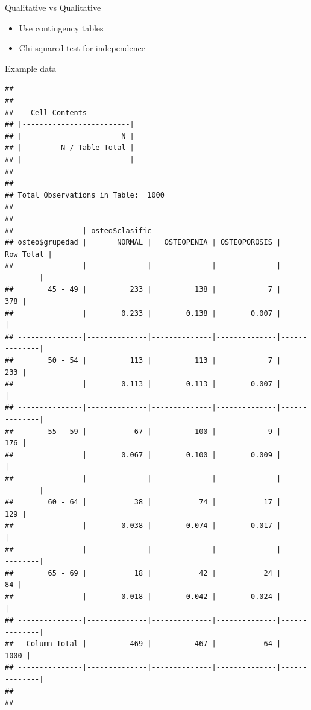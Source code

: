 \documentclass[
  ignorenonframetext,
]{beamer}
\newenvironment{Shaded}{\begin{snugshade}}{\end{snugshade}}
\newcommand{\AttributeTok}[1]{\textcolor[rgb]{0.13,0.29,0.53}{#1}}
\newcommand{\ConstantTok}[1]{\textcolor[rgb]{0.56,0.35,0.01}{#1}}
\newcommand{\FunctionTok}[1]{\textcolor[rgb]{0.13,0.29,0.53}{\textbf{#1}}}
\newcommand{\NormalTok}[1]{#1}
\newcommand{\SpecialCharTok}[1]{\textcolor[rgb]{0.81,0.36,0.00}{\textbf{#1}}}
\providecommand{\tightlist}{%
  \setlength{\itemsep}{0pt}\setlength{\parskip}{0pt}}
\begin{document}
\begin{frame}[fragile]{Qualitative vs Qualitative}
\label{qualitative-vs-qualitative}
\begin{itemize}
\tightlist
\item
  Use contingency tables
\item
  Chi-squared test for independence
\end{itemize}

\begin{block}{Example data}
\label{example-data}
\begin{Shaded}
\end{Shaded}

\begin{verbatim}
## 
##  
##    Cell Contents
## |-------------------------|
## |                       N |
## |         N / Table Total |
## |-------------------------|
## 
##  
## Total Observations in Table:  1000 
## 
##  
##                | osteo$clasific 
## osteo$grupedad |       NORMAL |   OSTEOPENIA | OSTEOPOROSIS |    Row Total | 
## ---------------|--------------|--------------|--------------|--------------|
##        45 - 49 |          233 |          138 |            7 |          378 | 
##                |        0.233 |        0.138 |        0.007 |              | 
## ---------------|--------------|--------------|--------------|--------------|
##        50 - 54 |          113 |          113 |            7 |          233 | 
##                |        0.113 |        0.113 |        0.007 |              | 
## ---------------|--------------|--------------|--------------|--------------|
##        55 - 59 |           67 |          100 |            9 |          176 | 
##                |        0.067 |        0.100 |        0.009 |              | 
## ---------------|--------------|--------------|--------------|--------------|
##        60 - 64 |           38 |           74 |           17 |          129 | 
##                |        0.038 |        0.074 |        0.017 |              | 
## ---------------|--------------|--------------|--------------|--------------|
##        65 - 69 |           18 |           42 |           24 |           84 | 
##                |        0.018 |        0.042 |        0.024 |              | 
## ---------------|--------------|--------------|--------------|--------------|
##   Column Total |          469 |          467 |           64 |         1000 | 
## ---------------|--------------|--------------|--------------|--------------|
## 
## 
\end{verbatim}
\end{block}
\end{frame}
\end{document}
